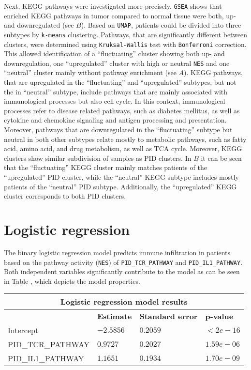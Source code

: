\documentclass[
  parskip,
  oneside]{scrreprt}
\begin{document}
Next, KEGG pathways were investigated more precisely. \texttt{GSEA}
shows that enriched KEGG pathways in tumor compared to normal tissue
were both, up- and downregulated (see  \(B\)). Based on
\texttt{UMAP}, patients could be divided into three subtypes by
\texttt{k-means} clustering. Pathways, that are significantly different
between clusters, were determined using \texttt{Kruksal-Wallis} test
with \texttt{Bonferroni} correction. This allowed identification of a
``fluctuating'' cluster showing both up- and downregulation, one
``upregulated'' cluster with high or neutral \texttt{NES} and one
``neutral'' cluster mainly without pathway enrichment (see 
\(A\)). KEGG pathways, that are upregulated in the ``fluctuating'' and
``upregulated'' subtypes, but not the in ``neutral'' subtype, include
pathways that are mainly associated with immunological processes but
also cell cycle. In this context, immunological processes refer to
disease related pathways, such as diabetes mellitus, as well as cytokine
and chemokine signaling and antigen processing and presentation.\\
Moreover, pathways that are downregulated in the ``fluctuating'' subtype
but neutral in both other subtypes relate mostly to metabolic pathways,
such as fatty acid, amino acid, and drug metabolism, as well as TCA
cycle. Moreover, KEGG clusters show similar subdivision of samples as
PID clusters. In  \(B\) it can be seen that the
``fluctuating'' KEGG cluster mainly matches patients of the
``upregulated'' PID cluster, while the ``neutral'' KEGG subtype includes
mostly patients of the ``neutral'' PID subtype. Additionally, the
``upregulated'' KEGG cluster corresponds to both PID clusters.

\hypertarget{logistic-regression}{%
\section{Logistic regression}\label{logistic-regression}}

The binary logistic regression model predicts immune infiltration in
patients based on the pathway activity (\texttt{NES}) of
\texttt{PID\_TCR\_PATHWAY} and \texttt{PID\_IL1\_PATHWAY}. Both
independent variables significantly contribute to the model as can be
seen in Table , which depicts the model properties.

\begin{table}[ht]
 \begin{tabular}{ |p{4.5cm}||p{3cm}|p{3cm}|p{3cm}|  }
  \hline
  \multicolumn{4}{|c|}{Logistic regression model results} \\
  \hline
   & \textbf{Estimate} & \textbf{Standard error} & \textbf{p-value}\\
  \hline
  Intercept   &  $-2.5856$  & $0.2059$ &   $<2e-16$\\
  PID\_TCR\_PATHWAY &   $0.9727$  & $0.2027$   & $1.59e-06$\\
  PID\_IL1\_PATHWAY & $1.1651$ & $0.1934$ &  $1.70e-09$\\
 \hline
 \end{tabular}
 \label{tab}
\end{table}
\end{document}
